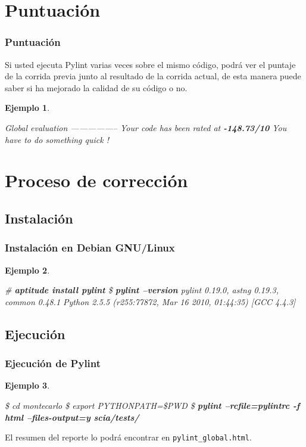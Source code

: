 \documentclass{beamer}
\newtheorem{ejemplo}{Ejemplo}
\begin{document}
\section{Puntuación}

\begin{frame}[fragile]
    \frametitle{Puntuación}
Si usted ejecuta Pylint varias veces sobre el mismo código, podrá ver el puntaje de la corrida previa junto al resultado de la corrida actual, de esta manera puede saber si ha mejorado la calidad de su código o no.

\begin{ejemplo}
\begin{semiverbatim}
Global evaluation
-----------------
Your code has been rated at \textbf{-148.73/10}
\alert{You have to do something quick !}
\end{semiverbatim}
\end{ejemplo}
\end{frame}

\section{Proceso de corrección}

\subsection{Instalación}

\begin{frame}[fragile]
\frametitle{Instalación en Debian GNU/Linux}

\begin{ejemplo}
\small
\begin{semiverbatim}
# \textbf{aptitude install pylint}
\$ \textbf{pylint --version}
pylint 0.19.0, 
astng 0.19.3, common 0.48.1
Python 2.5.5 (r255:77872, Mar 16 2010, 01:44:35) 
[GCC 4.4.3]
\end{semiverbatim}
\end{ejemplo}
\end{frame}

\subsection{Ejecución}

\begin{frame}[fragile]
\frametitle{Ejecución de Pylint}

\begin{ejemplo}
\tiny
\begin{semiverbatim}
\$ cd montecarlo
\$ export PYTHONPATH=\$PWD
\$ \textbf{pylint --rcfile=pylintrc -f html --files-output=y scia/tests/}
\end{semiverbatim}
\end{ejemplo}
El resumen del reporte lo podrá encontrar en \texttt{pylint\_global.html}.
\end{frame}
\end{document}
